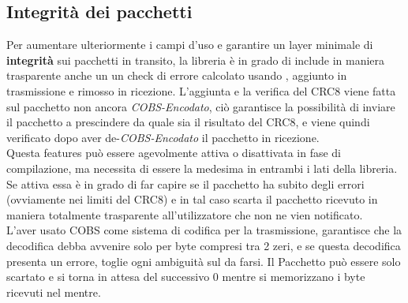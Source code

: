 \subsection{Integrità dei pacchetti}
Per aumentare ulteriormente i campi d’uso e garantire un layer minimale di \textbf{integrità} sui pacchetti in transito, la libreria è in grado di include in maniera trasparente anche un un check di errore calcolato usando \cite{CRC8}, aggiunto in trasmissione e rimosso in ricezione. L'aggiunta e la verifica del CRC8 viene fatta sul pacchetto non ancora \textit{COBS-Encodato}, ciò garantisce la possibilità di inviare il pacchetto a prescindere da quale sia il risultato del CRC8, e viene quindi verificato dopo aver de-\textit{COBS-Encodato} il pacchetto in ricezione.\\
Questa features può essere agevolmente attiva o disattivata in fase di compilazione, ma necessita di essere la medesima in entrambi i lati della libreria.\\
Se attiva essa è in grado di far capire se il pacchetto ha subito degli errori (ovviamente nei limiti del CRC8) e in tal caso scarta il pacchetto ricevuto in maniera totalmente trasparente all'utilizzatore che non ne vien notificato.\\
L’aver usato COBS come sistema di codifica per la trasmissione, garantisce che la decodifica debba avvenire solo per byte compresi tra 2 zeri, e se questa decodifica presenta un errore, toglie ogni ambiguità sul da farsi. Il Pacchetto può essere solo scartato e si torna in attesa del successivo 0 mentre si memorizzano i byte ricevuti nel mentre.

\newpage
